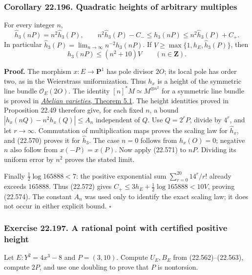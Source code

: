 \documentclass[
  11pt,
  a4paper,
]{article}
\begin{document}
\subsubsection{Corollary 22.196. Quadratic heights of arbitrary
multiples}\label{corollary-22.196.-quadratic-heights-of-arbitrary-multiples}

For every integer \(n\), \[
 \widehat h_3(nP)=n^2\widehat h_3(P),\qquad
 n^2\widehat h_3(P)-C_-
 \le h_3(nP)\le n^2\widehat h_3(P)+C_+.
 \tag{22.573}
\] In particular \(\widehat h_3(P)=\lim_{n\to\infty}n^{-2}h_3(nP)\). If
\(V\ge\max\{1,h_E,\widehat h_3(P)\}\), then \[
 h_3(nP)\le(n^2+10)V\qquad(n\in\mathbf Z).
 \tag{22.574}
\]

\textbf{Proof.} The morphism \(x:E\to\mathbf P^1\) has pole divisor
\(2O\); its local pole has order two, as in the Weierstrass
uniformization. Thus \(h_x\) is a height of the symmetric line bundle
\(\mathcal O_E(2O)\). The identity \([n]^*M\simeq M^{\otimes n^2}\) for
a symmetric line bundle is proved in
\href{https://github.com/KokunoYumeto/open-math-courses-public/blob/146dc81802e69cf262fb6cc65c1b9f74e71f4625/docs/courses/AG-GS/src/abelian-varieties.md\#5-multiplication-pulls-back-quadratically}{\emph{Abelian
varieties}, Theorem 5.1}. The height identities proved in Proposition
22.49 therefore give, for each fixed \(n\), a bound
\(|h_x(nQ)-n^2h_x(Q)|\le A_n\) independent of \(Q\). Use \(Q=2^rP\),
divide by \(4^r\), and let \(r\to\infty\). Commutation of multiplication
maps proves the scaling law for \(\widehat h_x\), and (22.570) proves it
for \(\widehat h_3\). The case \(n=0\) follows from \(h_x(O)=0\);
negative \(n\) also follow from \(x(-P)=x(P)\). Now apply (22.571) to
\(nP\). Dividing its uniform error by \(n^2\) proves the stated limit.

Finally \(\tfrac12\log165888<7\): the positive exponential sum
\(\sum_{r=0}^{20}14^r/r!\) already exceeds \(165888\). Thus (22.572)
gives \(C_+\le3h_E+\tfrac12\log165888<10V\), proving (22.574). The
constant \(A_n\) was used only to identify the exact scaling law; it
does not occur in either explicit bound. \(\square\)

\subsubsection{Exercise 22.197. A rational point with certified positive
height}\label{exercise-22.197.-a-rational-point-with-certified-positive-height}

Let \(E:Y^2=4x^3-8\) and \(P=(3,10)\). Compute \(U_E,B_E\) from
(22.562)--(22.563), compute \(2P\), and use one doubling to prove that
\(P\) is nontorsion.
\end{document}
